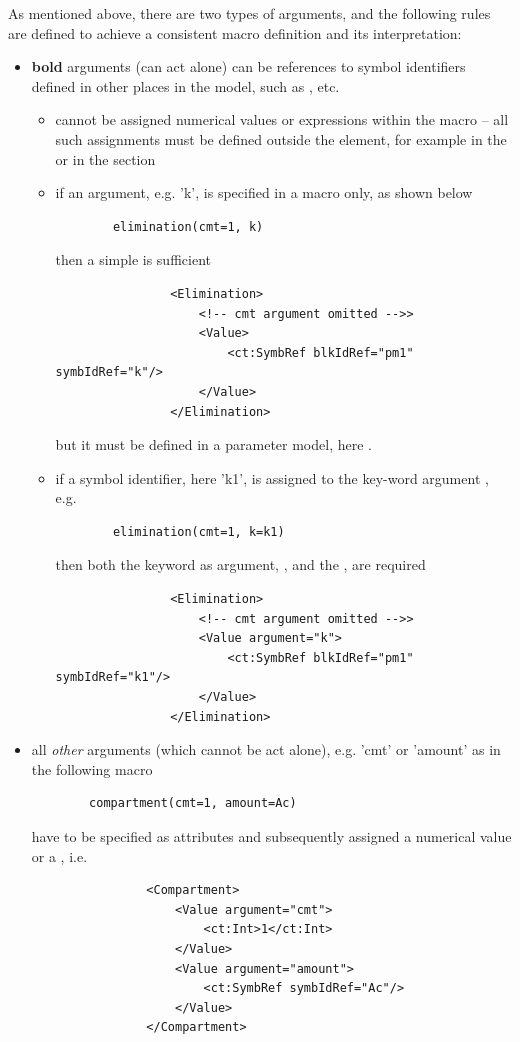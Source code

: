 As mentioned above, there are two types of arguments, and the following rules 
are defined to achieve a consistent macro definition and its interpretation:
\begin{itemize}
\item
\textbf{bold} arguments (can act alone) can be references to symbol identifiers defined in other 
places in the model, such as ,  etc.
\begin{itemize}
\item
cannot be assigned numerical values or expressions within the macro -- 
all such assignments must be defined outside the  element, for example in the 
 or in the  section
\item
if an argument, e.g. 'k', is specified in a macro only, as shown below
\lstset{language=NONMEMdataSet}
\begin{lstlisting}
		elimination(cmt=1, k)
\end{lstlisting}
then a simple  is sufficient
 \lstset{language=XML}
\begin{lstlisting}
                <Elimination>
                    <!-- cmt argument omitted -->>
                    <Value>
                        <ct:SymbRef blkIdRef="pm1" symbIdRef="k"/>
                    </Value>
                </Elimination>
\end{lstlisting}
but it must be defined in a parameter model, here .
\item
if a symbol identifier, here 'k1', is assigned to the key-word argument , e.g.
\lstset{language=NONMEMdataSet}
\begin{lstlisting}
		elimination(cmt=1, k=k1)
\end{lstlisting}
 then both the keyword as argument, , and the ,  are required 
 \lstset{language=XML}
\begin{lstlisting}
                <Elimination>
                    <!-- cmt argument omitted -->>
                    <Value argument="k">
                        <ct:SymbRef blkIdRef="pm1" symbIdRef="k1"/>
                    </Value>
                </Elimination>
\end{lstlisting}
\end{itemize}
\item
all \textit{other} arguments (which cannot be act alone), e.g. 'cmt' or 'amount' as in the following macro
\lstset{language=NONMEMdataSet}
\begin{lstlisting}
		compartment(cmt=1, amount=Ac)
\end{lstlisting}
 \lstset{language=XML}
have to be specified as attributes and subsequently assigned a numerical value 
or a , i.e.
\begin{lstlisting}
                <Compartment>
                    <Value argument="cmt">
                        <ct:Int>1</ct:Int>
                    </Value>
                    <Value argument="amount">
                        <ct:SymbRef symbIdRef="Ac"/>
                    </Value>
                </Compartment>
\end{lstlisting}

\end{itemize}


